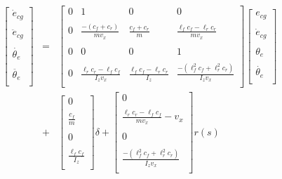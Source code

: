 \documentclass{article}
\begin{document}
\begin{eqnarray}
 \begin{bmatrix} 
 	\dot{e}_{cg} \\\\
 	\ddot{e}_{cg} \\\\
 	\dot{\theta_e} \\\\
 	\ddot{\theta_e} \\
 \end{bmatrix} &=& 
 \begin{bmatrix} 
 	0 & 1 & 0 & 0 \\\\
 	0 & \frac{-(c_f + c_r)}{mv_x} & \frac{c_f + c_r}{m} & \frac{\ell_fc_f - \ell_rc_r}{mv_x}\\\\
 	0 & 0 & 0 & 1 \\\\
 	0 & \frac{\ell_rc_r - \ell_fc_f}{I_zv_x} & \frac{\ell_fc_f - \ell_rc_r}{I_z} & \frac{-(\ell^2_fc_f + \ell^2_rc_r)}{I_zv_x}\\
 \end{bmatrix}
 \begin{bmatrix} 
 	{e}_{cg} \\\\
 	\dot{e}_{cg} \\\\
 	{\theta_e} \\\\
 	\dot{\theta_e} \\
 \end{bmatrix}\\ &+& \begin{bmatrix} 
 	0 \\\\
 	\frac{c_f}{m} \\\\
 	0 \\\\
 	\frac{\ell_fc_f}{I_z} \\
 \end{bmatrix} \delta
 + \begin{bmatrix} 
 	0 \\\\
 	\frac{\ell_rc_r - \ell_fc_f}{mv_x} - v_x \\\\
 	0 \\\\
 	\frac{-(\ell^2_fc_f + \ell^2_rc_r)}{I_zv_x} \\
 \end{bmatrix} r(s)
\end{eqnarray}
\end{document}
